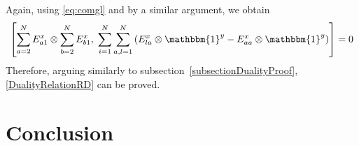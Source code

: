\documentclass[11pt]{article}
\numberwithin{equation}{section}
\numberwithin{equation}{subsection}
\begin{document}
 Again, using \eqref{eq:comgl} and by a similar argument, we obtain
\begin{equation}
\left[\sum_{a=2}^{N}E_{a1}^{x}\otimes \sum_{b=2}^{N}E_{b1}^{x},\;\sum_{i=1}^{N}\sum_{a,l=1}^{N}\left(E_{la}^{x}\otimes \mathbbm{1}^{y}-E_{aa}^{x}\otimes \mathbbm{1}^{y}\right)\right]=0
\end{equation}
Therefore, arguing similarly to subsection~\ref{subsectionDualityProof}, \eqref{DualityRelationRD} can be proved. 




\section{Conclusion}






\end{document}
